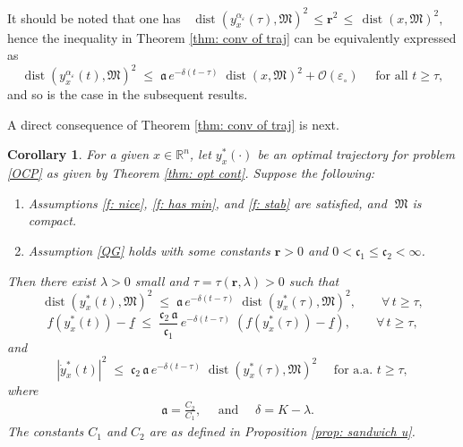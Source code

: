 \documentclass[12pt]{amsart}
\numberwithin{equation}{section}
\theoremstyle{plain}
\newtheorem{corollary}[theorem]{Corollary}
\begin{document}
It should be noted that one has $\;\;\operatorname{dist}(y_{x}^{\alpha_{\varepsilon}}(\tau),\mathfrak{M})^{2}\,\leq \mathbf{r}^2 \, \leq \, \operatorname{dist}(x,\mathfrak{M})^{2},$ \; 
hence the inequality in Theorem \ref{thm: conv of traj} can be equivalently expressed as 
\begin{equation*}
    \operatorname{dist}(y_{x}^{\alpha_{\varepsilon}}(t),\mathfrak{M})^{2} 
    \; \leq \;  
    \mathfrak{a}\,e^{-\delta(t-\tau)}\;\operatorname{dist}(x,\mathfrak{M})^{2} + \mathcal{O}(\varepsilon_{\circ}) \quad \text{ for all } t\geq \tau,
\end{equation*}
and so is the case in the subsequent results. 

A direct consequence of Theorem \ref{thm: conv of traj} is next. 


\begin{corollary}\label{cor: conv of traj}
For a given $x\in\mathbb{R}^{n}$, let $y_{x}^{*}(\cdot)$ be an optimal trajectory for problem \eqref{OCP} as given by Theorem \ref{thm: opt cont}. Suppose the following: 
\begin{enumerate}[label = -]
    \item Assumptions \ref{f: nice}, \ref{f: has min}, and \ref{f: stab} are satisfied, and $\;\mathfrak{M}$ is compact.
    \item Assumption \ref{QG} holds  with some constants $\mathbf{r}>0$ and $0<\mathfrak{c}_{1}\leq \mathfrak{c}_{2}<\infty$.
\end{enumerate}
Then there exist $\lambda>0$ small and $\tau = \tau(\mathbf{r}, \lambda)>0$ such that 
\begin{equation*}
    \operatorname{dist}(y_{x}^{*}(t),\mathfrak{M})^{2} 
    \;  \leq \;  
    \mathfrak{a}\,e^{-\delta(t-\tau)}\;\operatorname{dist}(y_{x}^{*}(\tau),\mathfrak{M})^{2}, \quad \quad \forall\,t\geq\tau,
\end{equation*}
\begin{equation*}
    f(y_{x}^{*}(t))-\underline{f} 
    \; \leq \;  
    \frac{\mathfrak{c}_2\,\mathfrak{a}}{\mathfrak{c}_1}\,e^{-\delta(t-\tau)}\;(f(y_{x}^{*}(\tau))-\underline{f}),\quad \quad \forall\,t\geq\tau,
\end{equation*}
and
\begin{equation*}
    |\dot{y}_{x}^{*}(t)|^{2} 
    \;  \leq \;  
    \mathfrak{c}_{2}\,\mathfrak{a}\,e^{-\delta(t-\tau)}\;\operatorname{dist}(y_{x}^{*}(\tau),\mathfrak{M})^{2} \quad \text{ for a.a. } t\geq \tau,
\end{equation*}
where
\begin{equation*}
\begin{aligned}
    & \mathfrak{a}=\frac{C_{2}}{C_{1}}, \quad \text{ and }  \quad \delta = K - \lambda.
\end{aligned}
\end{equation*}
The constants $C_{1}$ and $C_{2}$ are as defined in Proposition \ref{prop: sandwich u}.
\end{corollary}
\end{document}
